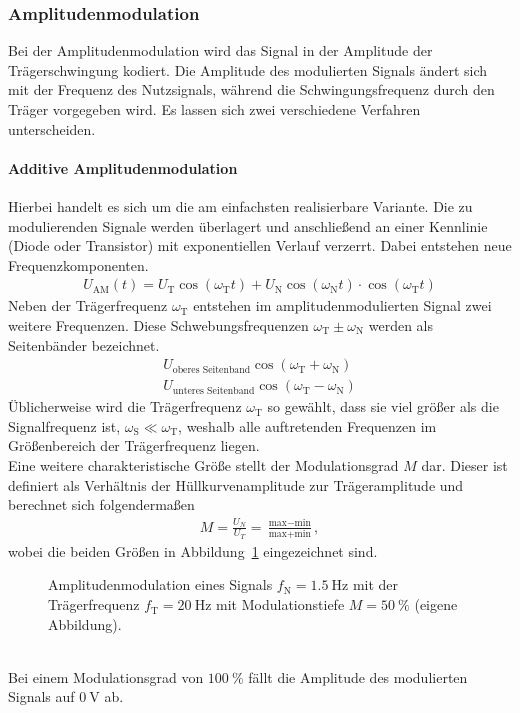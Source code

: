 \documentclass[a4paper,twoside,final]{article}
\begin{document}
\subsubsection{Amplitudenmodulation}
Bei der Amplitudenmodulation wird das Signal in der Amplitude der Trägerschwingung kodiert. Die Amplitude des modulierten Signals ändert sich mit der Frequenz des Nutzsignals, während die Schwingungsfrequenz durch den Träger vorgegeben wird. Es lassen sich zwei verschiedene Verfahren unterscheiden.
\paragraph{Additive Amplitudenmodulation}
Hierbei handelt es sich um die am einfachsten realisierbare Variante. Die zu modulierenden Signale werden überlagert und anschließend an einer Kennlinie (Diode oder Transistor) mit exponentiellen Verlauf verzerrt. Dabei entstehen neue Frequenzkomponenten.
\begin{align}
  U_\text{AM}(t) = U_\text{T}\cos(\omega_\text{T}t) + U_\text{N}\cos(\omega_\text{N}t)\cdot\cos(\omega_\text{T}t)
\end{align}
Neben der Trägerfrequenz $\omega_\text{T}$ entstehen im amplitudenmodulierten Signal zwei weitere Frequenzen. Diese Schwebungsfrequenzen $\omega_\text{T} \pm \omega_\text{N}$ werden als Seitenbänder bezeichnet.
\begin{align}
  U_\text{oberes Seitenband}\cos(\omega_\text{T} + \omega_\text{N})\\
  U_\text{unteres Seitenband}\cos(\omega_\text{T} - \omega_\text{N})
\end{align}
Üblicherweise wird die Trägerfrequenz $\omega_\text{T}$ so gewählt, dass sie viel größer als die Signalfrequenz ist, $\omega_\text{S} \ll \omega_\text{T}$, weshalb alle auftretenden Frequenzen im Größenbereich der Trägerfrequenz liegen.\\
Eine weitere charakteristische Größe stellt der Modulationsgrad $M$ dar. Dieser ist definiert als Verhältnis der Hüllkurvenamplitude zur Trägeramplitude und berechnet sich folgendermaßen
\begin{align}
  M = \frac{U_N}{U_T} = \frac{\text{max}-\text{min}}{\text{max}+\text{min}},
\end{align}
wobei die beiden Größen in Abbildung~\ref{fig:Amplitudenmodulation} eingezeichnet sind.
\begin{figure}[htp]
    \centering
        
    \caption{Amplitudenmodulation eines Signals $f_\text{N} = \SI{1.5}{\hertz}$ mit der Trägerfrequenz $f_\text{T} = \SI{20}{\hertz}$ mit Modulationstiefe $M = \SI{50}{\percent}$ (eigene Abbildung).}
    \label{fig:Amplitudenmodulation}
\end{figure}\\
Bei einem Modulationsgrad von $\SI{100}{\percent}$ fällt die Amplitude des modulierten Signals auf $\SI{0}{\volt}$ ab.
\end{document}
